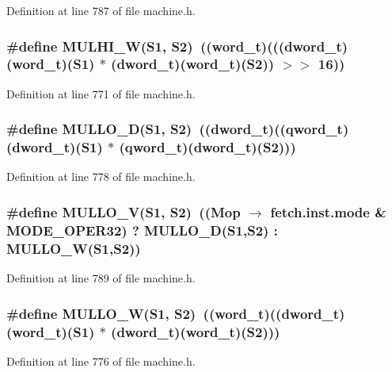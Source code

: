 Definition at line 787 of file machine.h.
\subsubsection[{MULHI\_\-W}]{\setlength{\rightskip}{0pt plus 5cm}\#define MULHI\_\-W(S1, \/  S2)~(({\bf word\_\-t})((({\bf dword\_\-t})({\bf word\_\-t})(S1) $\ast$ ({\bf dword\_\-t})({\bf word\_\-t})(S2)) $>$$>$ 16))}\label{machine_8h_65c4e0b2fdaf01beee284e1445703062}




Definition at line 771 of file machine.h.
\subsubsection[{MULLO\_\-D}]{\setlength{\rightskip}{0pt plus 5cm}\#define MULLO\_\-D(S1, \/  S2)~(({\bf dword\_\-t})((qword\_\-t)({\bf dword\_\-t})(S1) $\ast$ (qword\_\-t)({\bf dword\_\-t})(S2)))}\label{machine_8h_c25d93be5976188fef6d6b3a899d7fa0}




Definition at line 778 of file machine.h.
\subsubsection[{MULLO\_\-V}]{\setlength{\rightskip}{0pt plus 5cm}\#define MULLO\_\-V(S1, \/  S2)~((Mop $\rightarrow$ fetch.inst.mode \& MODE\_\-OPER32) ? MULLO\_\-D(S1,S2) : MULLO\_\-W(S1,S2))}\label{machine_8h_30f8047b9d6e2ac6ea17bf6ba38c3912}




Definition at line 789 of file machine.h.
\subsubsection[{MULLO\_\-W}]{\setlength{\rightskip}{0pt plus 5cm}\#define MULLO\_\-W(S1, \/  S2)~(({\bf word\_\-t})(({\bf dword\_\-t})({\bf word\_\-t})(S1) $\ast$ ({\bf dword\_\-t})({\bf word\_\-t})(S2)))}\label{machine_8h_fc5f9be664c417a85865d71b13600755}




Definition at line 776 of file machine.h.
